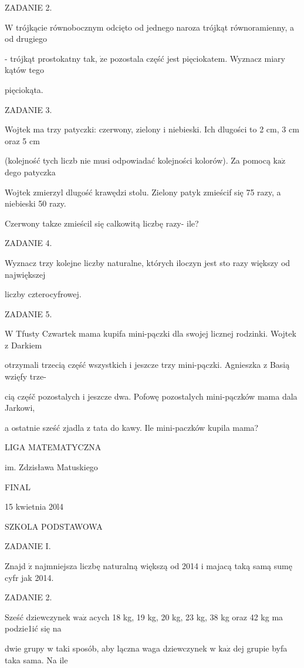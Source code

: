 \documentclass[a4paper,12pt]{article}
\begin{document}
ZADANIE 2.

$\mathrm{W}$ trójkącie równobocznym odcięto od jednego naroza trójkąt równoramienny, a od drugiego

- trójkąt prostokatny tak, $\dot{\mathrm{z}}\mathrm{e}$ pozostala część jest pięciokatem. Wyznacz miary kątów tego

pięciokąta.

ZADANIE 3.

Wojtek ma trzy patyczki: czerwony, zielony i niebieski. Ich dlugości to 2 cm, 3 cm oraz 5 cm

(kolejność tych liczb nie musi odpowiadać kolejności kolorów). Za pomocą $\mathrm{k}\mathrm{a}\dot{\mathrm{z}}$ dego patyczka

Wojtek zmierzyl dlugość krawędzi stolu. Zielony patyk zmieścif się 75 razy, a niebieski 50 razy.

Czerwony takze zmieścil się calkowitą liczbę razy- ile?

ZADANIE 4.

Wyznacz trzy kolejne liczby naturalne, których iloczyn jest sto razy większy od największej

liczby czterocyfrowej.

ZADANIE 5.

W Tfusty Czwartek mama kupifa mini-pączki dla swojej licznej rodzinki. Wojtek z Darkiem

otrzymali trzecią część wszystkich i jeszcze trzy mini-pączki. Agnieszka z Basią wzięfy trze-

cią częśč pozostalych i jeszcze dwa. Pofowę pozostalych mini-pączków mama dala Jarkowi,

a ostatnie sześć zjadla z tata do kawy. Ile mini-paczków kupila mama?






LIGA MATEMATYCZNA

im. Zdzisława Matuskiego

FINAL

15 kwietnia 20l4

SZKOLA PODSTAWOWA

ZADANIE I.

Znajd $\acute{\mathrm{z}}$ najmniejsza liczbę naturalną większą od 2014 i majacą taką samą sumę cyfr jak 2014.

ZADANIE 2.

Sześć dziewczynek $\mathrm{w}\mathrm{a}\dot{\mathrm{z}}$ acych 18 kg, 19 kg, 20 kg, 23 kg, 38 kg oraz 42 kg ma podzie1ić się na

dwie grupy w taki sposób, aby lączna waga dziewczynek w $\mathrm{k}\mathrm{a}\dot{\mathrm{z}}$ dej grupie byfa taka sama. Na ile
\end{document}
